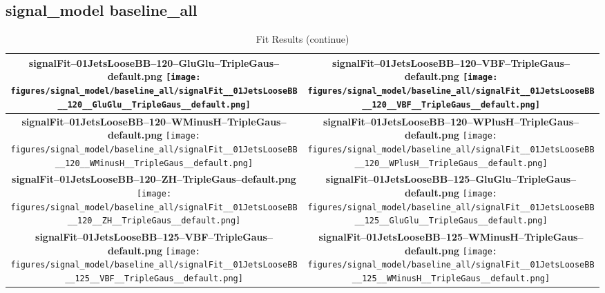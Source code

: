 \subsection{signal\_model baseline\_all}
\begin{longtable}{|c|c|}
\caption{Fit Results}
\endfirsthead
\caption{Fit Results (continue)}
\endhead
\hline
\parbox{0.49\textwidth}{
\centering
{\bfseries signalFit--01JetsLooseBB--120--GluGlu--TripleGaus--default.png}
\texttt{[image: figures/signal\_model/baseline\_all/signalFit\_\_01JetsLooseBB\_\_120\_\_GluGlu\_\_TripleGaus\_\_default.png]}
}
 & \parbox{0.49\textwidth}{
\centering
{\bfseries signalFit--01JetsLooseBB--120--VBF--TripleGaus--default.png}
\texttt{[image: figures/signal\_model/baseline\_all/signalFit\_\_01JetsLooseBB\_\_120\_\_VBF\_\_TripleGaus\_\_default.png]}
}
 \\
\hline
\parbox{0.49\textwidth}{
\centering
{\bfseries signalFit--01JetsLooseBB--120--WMinusH--TripleGaus--default.png}
\texttt{[image: figures/signal\_model/baseline\_all/signalFit\_\_01JetsLooseBB\_\_120\_\_WMinusH\_\_TripleGaus\_\_default.png]}
}
 & \parbox{0.49\textwidth}{
\centering
{\bfseries signalFit--01JetsLooseBB--120--WPlusH--TripleGaus--default.png}
\texttt{[image: figures/signal\_model/baseline\_all/signalFit\_\_01JetsLooseBB\_\_120\_\_WPlusH\_\_TripleGaus\_\_default.png]}
}
 \\
\hline
\parbox{0.49\textwidth}{
\centering
{\bfseries signalFit--01JetsLooseBB--120--ZH--TripleGaus--default.png}
\texttt{[image: figures/signal\_model/baseline\_all/signalFit\_\_01JetsLooseBB\_\_120\_\_ZH\_\_TripleGaus\_\_default.png]}
}
 & \parbox{0.49\textwidth}{
\centering
{\bfseries signalFit--01JetsLooseBB--125--GluGlu--TripleGaus--default.png}
\texttt{[image: figures/signal\_model/baseline\_all/signalFit\_\_01JetsLooseBB\_\_125\_\_GluGlu\_\_TripleGaus\_\_default.png]}
}
 \\
\hline
\parbox{0.49\textwidth}{
\centering
{\bfseries signalFit--01JetsLooseBB--125--VBF--TripleGaus--default.png}
\texttt{[image: figures/signal\_model/baseline\_all/signalFit\_\_01JetsLooseBB\_\_125\_\_VBF\_\_TripleGaus\_\_default.png]}
}
 & \parbox{0.49\textwidth}{
\centering
{\bfseries signalFit--01JetsLooseBB--125--WMinusH--TripleGaus--default.png}
\texttt{[image: figures/signal\_model/baseline\_all/signalFit\_\_01JetsLooseBB\_\_125\_\_WMinusH\_\_TripleGaus\_\_default.png]}
}
 \\

\end{longtable}
